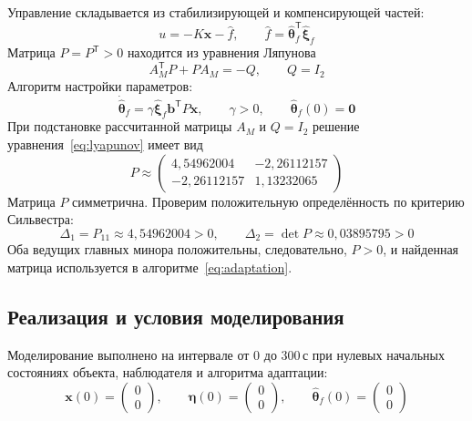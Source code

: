 Управление складывается из стабилизирующей и компенсирующей частей:
\begin{equation}
  u=-K\bm x-\hat f,
  \qquad
  \hat f=\hat{\bm\theta}_f^{\mathsf T}\hat{\bm\xi}_f
  \label{eq:control}
\end{equation}
Матрица $P=P^{\mathsf T}>0$ находится из уравнения Ляпунова
\begin{equation}
  A_M^{\mathsf T}P+PA_M=-Q,
  \qquad Q=I_2
  \label{eq:lyapunov}
\end{equation}
Алгоритм настройки параметров:
\begin{equation}
  \dot{\hat{\bm\theta}}_f
    =\gamma\hat{\bm\xi}_f\bm b^{\mathsf T}P\bm x,
  \qquad \gamma>0,
  \qquad \hat{\bm\theta}_f(0)=\bm 0
  \label{eq:adaptation}
\end{equation}
При подстановке рассчитанной матрицы $A_M$ и $Q=I_2$ решение
уравнения~\eqref{eq:lyapunov} имеет вид
\begin{equation}
  P\approx
  \begin{pmatrix}
    4{,}54962004&-2{,}26112157\\
    -2{,}26112157&1{,}13232065
  \end{pmatrix}
  \label{eq:lyapunov-solution}
\end{equation}
Матрица $P$ симметрична. Проверим положительную определённость
по критерию Сильвестра:
\begin{equation}
  \Delta_1=P_{11}\approx4{,}54962004>0,
  \qquad
  \Delta_2=\det P\approx0{,}03895795>0
  \label{eq:lyapunov-positive}
\end{equation}
Оба ведущих главных минора положительны, следовательно, $P>0$,
и найденная матрица используется в алгоритме~\eqref{eq:adaptation}.


\subsection{Реализация и условия моделирования}

Моделирование выполнено на интервале от $0$ до
$300\,\text{с}$ при нулевых начальных состояниях объекта,
наблюдателя и алгоритма адаптации:
\begin{equation}
  \bm x(0)=\begin{pmatrix}0\\0\end{pmatrix},
  \qquad
  \bm\eta(0)=\begin{pmatrix}0\\0\end{pmatrix},
  \qquad
  \hat{\bm\theta}_f(0)=\begin{pmatrix}0\\0\end{pmatrix}
  \label{eq:simulation-initial-conditions}
\end{equation}


